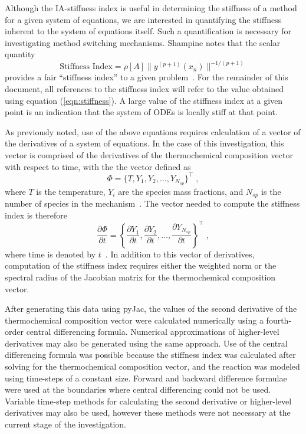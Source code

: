 \documentclass[12pt]{ussci}
\begin{document}
Although the IA-stiffness index is useful in determining the stiffness of a method for a given system of equations, we are interested in quantifying the stiffness inherent to the system of equations itself.
Such a quantification is necessary for investigating method switching mechanisms.
Shampine notes that the scalar quantity
\begin{equation}\label{eqn:stiffness}
    \textrm{Stiffness Index} = \rho [A] \|y^{(p+1)}(x_n)\|^{-1/(p+1)}
\end{equation}
provides a fair ``stiffness index'' to a given problem~\cite{Shampine1985}. For the remainder of this document, all references to the stiffness index will refer to the value obtained using equation (\ref{eqn:stiffness}).
A large value of the stiffness index at a given point is an indication that the system of ODEs is locally stiff at that point.

As previously noted, use of the above equations requires calculation of a vector of the derivatives of a system of equations.
In the case of this investigation, this vector is comprised of the derivatives of the thermochemical composition vector with respect to time, with the the vector defined as
\begin{equation}
    \Phi = \{T, Y_1, Y_2, \dots, Y_{N_{sp}} \}^\intercal \;,
\end{equation}
where $T$ is the temperature, $Y_i$ are the species mass fractions, and $N_{sp}$ is the number of species in the mechanism~\cite{Niemeyer:2017}.
The vector needed to compute the stiffness index is therefore
\begin{equation}
    \frac{\partial \Phi}{\partial t} = \left\{\frac{\partial Y_1}{\partial t}, \frac{\partial Y_2}{\partial t}, \dots, \frac{\partial Y_{N_{sp}}}{\partial t} \right\}^\intercal \;,
\end{equation}
where time is denoted by $t$~\cite{Niemeyer:2017}.
In addition to this vector of derivatives, computation of the stiffness index requires either the weighted norm or the spectral radius of the Jacobian matrix for the thermochemical composition vector.

After generating this data using pyJac, the values of the second derivative of the thermochemical composition vector were calculated numerically using a fourth-order central differencing formula.
Numerical approximations of higher-level derivatives may also be generated using the same approach.
Use of the central differencing formula was possible because the stiffness index was calculated after solving for the thermochemical composition vector, and the reaction was modeled using time-steps of a constant size.
Forward and backward difference formulae were used at the boundaries where central differencing could not be used.
Variable time-step methods for calculating the second derivative or higher-level derivatives may also be used, however these methods were not necessary at the current stage of the investigation.
\end{document}
